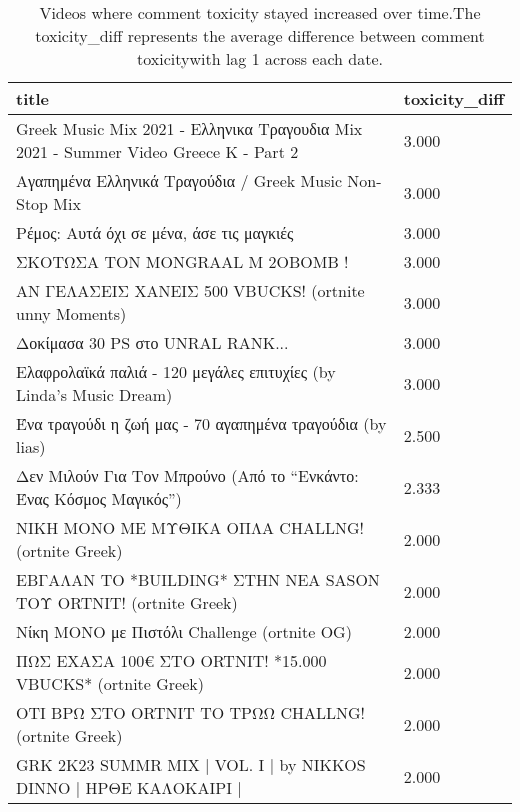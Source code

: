 \begin{table}
\caption{Videos where comment toxicity stayed increased over time.The toxicity\_diff represents the average difference between comment toxicitywith lag 1 across each date.}
\label{tab::toxic_increasing}
\begin{tabular}{|p{10cm}|p{1cm}|}
\toprule
title & toxicity\_diff \\
\midrule
Greek Music Mix 2021 - Ελληνικα Τραγουδια Mix 2021 - Summer Video Greece K - Part 2 & 3.000 \\
Αγαπημένα Ελληνικά Τραγούδια / Greek Music Non-Stop Mix & 3.000 \\
Ρέμος: Αυτά όχι σε μένα, άσε τις μαγκιές & 3.000 \\
ΣΚΟΤΩΣΑ ΤΟΝ MONGRAAL M 2OBOMB ! & 3.000 \\
ΑΝ ΓΕΛΑΣΕΙΣ ΧΑΝΕΙΣ 500 VBUCKS! (ortnite unny Moments) & 3.000 \\
Δοκίμασα 30 PS στο UNRAL RANK... & 3.000 \\
Ελαφρολαϊκά παλιά - 120 μεγάλες επιτυχίες (by Linda's Music Dream) & 3.000 \\
Ένα τραγούδι η ζωή μας - 70 αγαπημένα τραγούδια (by lias) & 2.500 \\
Δεν Μιλούν Για Τον Μπρούνο (Από το “Ενκάντο: Ένας Κόσμος Μαγικός”) & 2.333 \\
ΝΙΚΗ ΜΟΝΟ ΜΕ ΜΥΘΙΚΑ ΟΠΛΑ CHALLNG! (ortnite Greek) & 2.000 \\
ΕΒΓΑΛΑΝ ΤΟ *BUILDING* ΣΤΗΝ ΝΕΑ SASON ΤΟΥ ORTNIT! (ortnite Greek) & 2.000 \\
Νίκη ΜΟΝΟ με Πιστόλι Challenge (ortnite OG) & 2.000 \\
ΠΩΣ ΕΧΑΣΑ 100€ ΣΤΟ ORTNIT! *15.000 VBUCKS* (ortnite Greek) & 2.000 \\
ΟΤΙ ΒΡΩ ΣΤΟ ORTNIT ΤΟ ΤΡΩΩ CHALLNG! (ortnite Greek) & 2.000 \\
GRK 2K23 SUMMR MIX | VOL. I | by NIKKOS DINNO | ΗΡΘΕ ΚΑΛΟΚΑΙΡΙ | & 2.000 \\
\bottomrule
\end{tabular}
\end{table}
